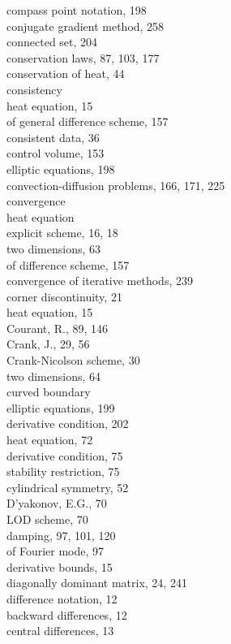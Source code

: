 \documentclass[10pt]{article}
\begin{document}
compass point notation, 198\\
conjugate gradient method, 258\\
connected set, 204\\
conservation laws, 87, 103, 177\\
conservation of heat, 44\\
consistency\\
heat equation, 15\\
of general difference scheme, 157\\
consistent data, 36\\
control volume, 153\\
elliptic equations, 198\\
convection-diffusion problems, 166, 171, 225\\
convergence\\
heat equation\\
explicit scheme, 16, 18\\
two dimensions, 63\\
of difference scheme, 157\\
convergence of iterative methods, 239\\
corner discontinuity, 21\\
heat equation, 15\\
Courant, R., 89, 146\\
Crank, J., 29, 56\\
Crank-Nicolson scheme, 30\\
two dimensions, 64\\
curved boundary\\
elliptic equations, 199\\
derivative condition, 202\\
heat equation, 72\\
derivative condition, 75\\
stability restriction, 75\\
cylindrical symmetry, 52\\
D'yakonov, E.G., 70\\
LOD scheme, 70\\
damping, 97, 101, 120\\
of Fourier mode, 97\\
derivative bounds, 15\\
diagonally dominant matrix, 24, 241\\
difference notation, 12\\
backward differences, 12\\
central differences, 13\\
\end{document}
